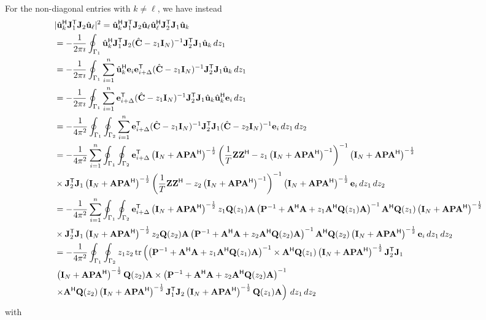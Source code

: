 \documentclass[11pt,a4paper]{article}
\begin{document}
For the non-diagonal entries with $k \neq \ell$, we have instead
\begin{align*}
		&|\hat \uu_k^\H \J_1^\T \J_2 \hat \uu_\ell|^2 = \hat \uu_k^\H \J_1^\T \J_2 \hat \uu_\ell \hat \uu_\ell^\H \J_2^\T \J_1 \hat \uu_k \\
		&= -\frac1{2 \pi \imath} \oint_{\Gamma_1} \hat \uu_k^\H \J_1^\T \J_2 (\hat \C - z_1 \I_N)^{-1} \J_2^\T \J_1 \hat \uu_k\,dz_1 \\
		&= -\frac1{2 \pi \imath} \oint_{\Gamma_1} \sum_{i=1}^n \hat \uu_k^\H \ee_i \ee_{i + \Delta}^\T (\hat \C - z_1 \I_N)^{-1} \J_2^\T \J_1 \hat \uu_k\,dz_1 \\
		&= -\frac1{2 \pi \imath} \oint_{\Gamma_1} \sum_{i=1}^n \ee_{i + \Delta}^\T (\hat \C - z_1 \I_N)^{-1} \J_2^\T \J_1 \hat \uu_k \hat \uu_k^\H \ee_i\,dz_1 \\
		&= -\frac1{4 \pi^2} \oint_{\Gamma_1} \oint_{\Gamma_2} \sum_{i=1}^n \ee_{i + \Delta}^\T (\hat \C - z_1 \I_N)^{-1} \J_2^\T \J_1 (\hat \C - z_2 \I_N)^{-1} \ee_i\,dz_1\,dz_2 \\
		&= -\frac1{4 \pi^2} \sum_{i=1}^n \oint_{\Gamma_1} \oint_{\Gamma_2} \ee_{i + \Delta}^\T \left(\I_N + \A \P \A^\H \right)^{-\frac12} \left( \frac1T \Z \Z^\H - z_1 \left(\I_N + \A \P \A^\H \right)^{-1} \right)^{-1} \left(\I_N + \A \P \A^\H \right)^{-\frac12} \\ 
		&\times \J_2^\T \J_1 \left(\I_N + \A \P \A^\H \right)^{-\frac12} \left( \frac1T \Z \Z^\H - z_2 \left(\I_N + \A \P \A^\H \right)^{-1} \right)^{-1} \left(\I_N + \A \P \A^\H \right)^{-\frac12} \ee_{i}\,dz_1\,dz_2 \\ 
		&= -\frac1{4 \pi^2} \sum_{i=1}^n \oint_{\Gamma_1} \oint_{\Gamma_2} \ee_{i + \Delta}^\T \left(\I_N + \A \P \A^\H \right)^{-\frac12} z_1 \Q(z_1) \A \left( \P^{-1} + \A^\H \A + z_1 \A^\H \Q(z_1) \A \right)^{-1} \A^\H \Q(z_1) \left(\I_N + \A \P \A^\H \right)^{-\frac12} \\ 
		&\times \J_2^\T \J_1 \left(\I_N + \A \P \A^\H \right)^{-\frac12} z_2 \Q(z_2) \A \left( \P^{-1} + \A^\H \A + z_2 \A^\H \Q(z_2) \A \right)^{-1} \A^\H \Q(z_2) \left(\I_N + \A \P \A^\H \right)^{-\frac12} \ee_{i}\,dz_1\,dz_2 \\ 
		&=- \frac1{4 \pi^2} \oint_{\Gamma_1} \oint_{\Gamma_2} z_1 z_2 \tr \left(  \left( \P^{-1} + \A^\H \A + z_1 \A^\H \Q(z_1) \A \right)^{-1} \times \A^\H \Q(z_1) \left(\I_N + \A \P \A^\H \right)^{-\frac12} \J_2^\T \J_1 \right. \\
		 &\left. \left(\I_N + \A \P \A^\H \right)^{-\frac12} \Q(z_2) \A \times \left( \P^{-1} + \A^\H \A + z_2 \A^\H \Q(z_2) \A \right)^{-1} \right. \\ 
		 &\left. \times \A^\H \Q(z_2) \left(\I_N + \A \P \A^\H \right)^{-\frac12} \J_1^\T \J_2 \left(\I_N + \A \P \A^\H \right)^{-\frac12} \Q(z_1) \A \right) \,dz_1\,dz_2
\end{align*}
with 
\end{document}
